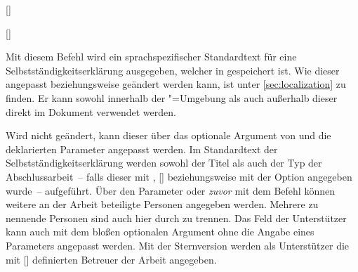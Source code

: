 \begin{Declaration*}{}
\begin{Declaration*}{}
\begin{Declaration*}{}
\begin{Declaration}{[]}
\begin{Declaration}[v2.05]{[\LParameter]}
\begin{Declaration}{}
\begin{Declaration}{}
\begin{Declaration}{}
\begin{Declaration}{}
\begin{Declaration}[v2.02]{}
\begin{Declaration}[v2.02]{%
}
\begin{Declaration}[v2.02]{%
}
\begin{Declaration}{}
\printdeclarationlist%
%
%
Mit diesem Befehl wird ein sprachspezifischer Standardtext für eine 
Selbstständigkeitserklärung ausgegeben, welcher in  
gespeichert ist. Wie dieser angepasst beziehungsweise geändert werden kann, ist 
unter \autoref{sec:localization} zu finden. Er kann sowohl innerhalb der 
"=Umgebung als auch außerhalb dieser direkt im 
Dokument verwendet werden. 

Wird  nicht geändert, kann dieser über das optionale 
Argument von  und die deklarierten Parameter angepasst 
werden. Im Standardtext der Selbstständigkeitserklärung werden sowohl der Titel 
als auch der Typ der Abschlussarbeit~-- falls dieser mit , 
[] beziehungsweise mit der 
Option  angegeben wurde~-- aufgeführt. Über den Parameter 
 oder \emph{zuvor} mit dem Befehl 
 können weitere an der Arbeit beteiligte Personen angegeben 
werden. Mehrere zu nennende Personen sind auch hier durch  zu 
trennen. Das Feld der Unterstützer kann auch mit dem bloßen optionalen Argument 
ohne die Angabe eines Parameters angepasst werden. 
Mit der Sternversion  werden als Unterstützer die mit 
[] definierten Betreuer der Arbeit 
angegeben.


\end{Declaration}
\end{Declaration}
\end{Declaration}
\end{Declaration}
\end{Declaration}
\end{Declaration}
\end{Declaration}
\end{Declaration}
\end{Declaration}
\end{Declaration}
\end{Declaration*}
\end{Declaration*}
\end{Declaration*}
